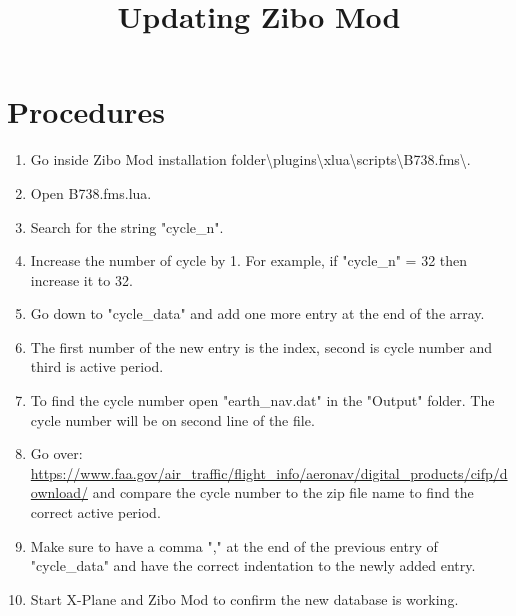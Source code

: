 \documentclass[12pt]{article}
\title{Updating Zibo Mod}
\begin{document}
\maketitle
\section{Procedures}
\begin{enumerate}
	\item Go inside Zibo Mod installation folder\textbackslash plugins\textbackslash xlua\textbackslash scripts\textbackslash B738.fms\textbackslash.
	\item Open B738.fms.lua.
	\item Search for the string "cycle\_n".
	\item Increase the number of cycle by 1. For example, if "cycle\_n" = 32 then increase it to 32.
	\item Go down to "cycle\_data" and add one more entry at the end of the array.
	\item The first number of the new entry is the index, second is cycle number and third is active period.
	\item To find the cycle number open "earth\_nav.dat" in the "Output" folder. The cycle number will be on second line of the file.
	\item Go over: \url{https://www.faa.gov/air_traffic/flight_info/aeronav/digital_products/cifp/download/} and compare the cycle number to the zip file name to find the correct active period.
	\item Make sure to have a comma "," at the end of the previous entry of "cycle\_data" and have the correct indentation to the newly added entry.
	\item Start X-Plane and Zibo Mod to confirm the new database is working.
\end{enumerate}
\end{document}

